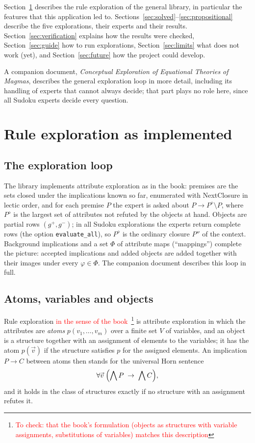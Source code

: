 \documentclass[11pt,a4paper]{article}
\theoremstyle{definition}
\theoremstyle{remark}
\newcommand{\code}[1]{\texttt{#1}}
\newcommand{\tocheck}[2]{\textcolor{red}{#1}\footnote{\textcolor{red}{To check: #2}}}
\newcommand{\pos}{^{+}}
\newcommand{\nega}{^{-}}
\begin{document}
Section~\ref{sec:library} describes the rule exploration of the general library, in particular the features that this application led to. Sections~\ref{sec:solved}--\ref{sec:propositional} describe the five explorations, their experts and their results. Section~\ref{sec:verification} explains how the results were checked, Section~\ref{sec:guide} how to run explorations, Section~\ref{sec:limits} what does not work (yet), and Section~\ref{sec:future} how the project could develop.

A companion document, \emph{Conceptual Exploration of Equational Theories of Magmas}, describes the general exploration loop in more detail, including its handling of experts that cannot always decide; that part plays no role here, since all Sudoku experts decide every question.

\section{Rule exploration as implemented}\label{sec:library}

\subsection{The exploration loop}

The library implements attribute exploration as in the book: premises are the sets closed under the implications known so far, enumerated with NextClosure in lectic order, and for each premise $P$ the expert is asked about $P \to P^{\diamond} \setminus P$, where $P^{\diamond}$ is the largest set of attributes not refuted by the objects at hand. Objects are partial rows $(g\pos, g\nega)$; in all Sudoku explorations the experts return complete rows (the option \code{evaluate\_all}), so $P^{\diamond}$ is the ordinary closure $P''$ of the context. Background implications and a set $\Phi$ of attribute maps (``mappings'') complete the picture: accepted implications and added objects are added together with their images under every $\varphi \in \Phi$. The companion document describes this loop in full.

\subsection{Atoms, variables and objects}

Rule exploration \tocheck{in the sense of the book~\cite{GO16}}{that the book's formulation (objects as structures with variable assignments, substitutions of variables) matches this description} is attribute exploration in which the attributes are \emph{atoms} $p(v_1, \dots, v_m)$ over a finite set $V$ of variables, and an object is a structure together with an assignment of elements to the variables; it has the atom $p(\vec v)$ if the structure satisfies $p$ for the assigned elements. An implication $P \to C$ between atoms then stands for the universal Horn sentence
\[
  \forall \vec v \;\Bigl(\bigwedge P \;\to\; \bigwedge C\Bigr),
\]
and it holds in the class of structures exactly if no structure with an assignment refutes it.
\end{document}

